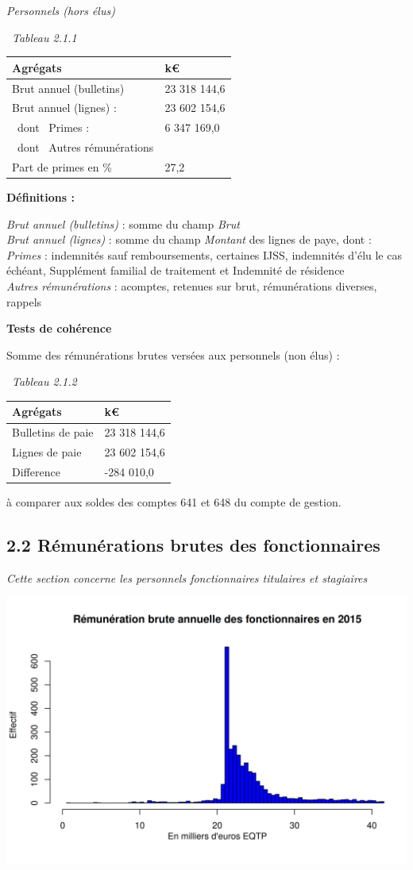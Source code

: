 \emph{Personnels (hors élus)}

~\emph{Tableau 2.1.1}

\begin{longtable}[]{@{}ll@{}}
\toprule
Agrégats & k€\tabularnewline
\midrule
\endhead
Brut annuel (bulletins) & 23 318 144,6\tabularnewline
Brut annuel (lignes) : & 23 602 154,6\tabularnewline
~dont ~Primes : & 6 347 169,0\tabularnewline
~dont ~Autres rémunérations &\tabularnewline
Part de primes en \% & 27,2\tabularnewline
\bottomrule
\end{longtable}

\textbf{Définitions :}

\emph{Brut annuel (bulletins)} : somme du champ \emph{Brut}\\
\emph{Brut annuel (lignes)} : somme du champ \emph{Montant} des lignes
de paye, dont :\\
\emph{Primes} : indemnités sauf remboursements, certaines IJSS,
indemnités d'élu le cas échéant, Supplément familial de traitement et
Indemnité de résidence\\
\emph{Autres rémunérations} : acomptes, retenues sur brut, rémunérations
diverses, rappels

\textbf{Tests de cohérence}

Somme des rémunérations brutes versées aux personnels (non élus) :

~\emph{Tableau 2.1.2}

\begin{longtable}[]{@{}ll@{}}
\toprule
Agrégats & k€\tabularnewline
\midrule
\endhead
Bulletins de paie & 23 318 144,6\tabularnewline
Lignes de paie & 23 602 154,6\tabularnewline
Difference & -284 010,0\tabularnewline
\bottomrule
\end{longtable}

à comparer aux soldes des comptes 641 et 648 du compte de gestion.

\hypertarget{remunerations-brutes-des-fonctionnaires}{%
\subsection{2.2 Rémunérations brutes des
fonctionnaires}\label{remunerations-brutes-des-fonctionnaires}}

\emph{Cette section concerne les personnels fonctionnaires titulaires et
stagiaires}

\includegraphics{altair_files/figure-latex/unnamed-chunk-43-1.png}

